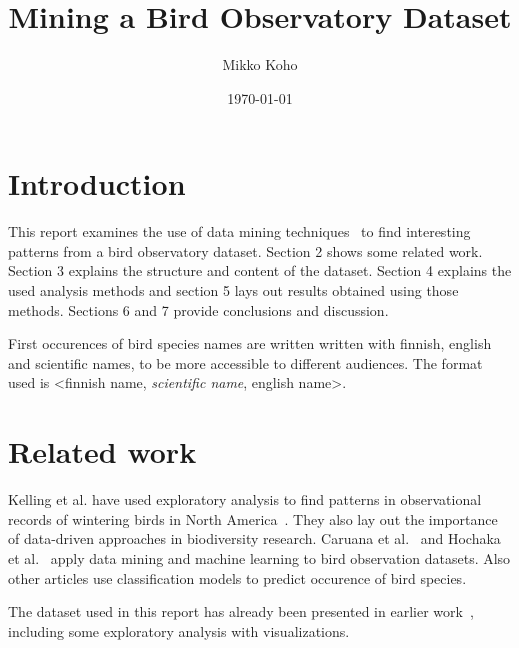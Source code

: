 \documentclass[english]{tktltiki2}
\title{Mining a Bird Observatory Dataset}
\author{Mikko Koho}
\date{\today}
\begin{document}
    

\frontmatter      %

\maketitle        %

\makeabstract     %

\tableofcontents  %


\mainmatter       %


\section{Introduction}

This report examines the use of data mining techniques~\cite{tan2006introduction} to find interesting patterns from a bird observatory dataset. Section 2 shows some related work. Section 3 explains the structure and content of the dataset. Section 4 explains the used analysis methods and section 5 lays out results obtained using those methods. Sections 6 and 7 provide conclusions and discussion.

First occurences of bird species names are written written with finnish, english and scientific names, to be more accessible to different audiences. The format used is <finnish name, \emph{scientific name}, english name>.


\section{Related work}

Kelling et al. have used exploratory analysis to find patterns in observational records of wintering birds in North America~\cite{kelling2009data}. They also lay out the importance of data-driven approaches in biodiversity research.
Caruana et al.~\cite{caruana2006mining} and Hochaka et al.~\cite{hochachka2007data} apply data mining and machine learning to bird observation datasets. Also other articles use classification models to predict occurence of bird species\cite{goetz2014relative, mentch2014ensemble}.

The dataset used in this report has already been presented in earlier work~\cite{koho-hyvonen-orni-2014, koho2015gradu}, including some exploratory analysis with visualizations.
\end{document}
